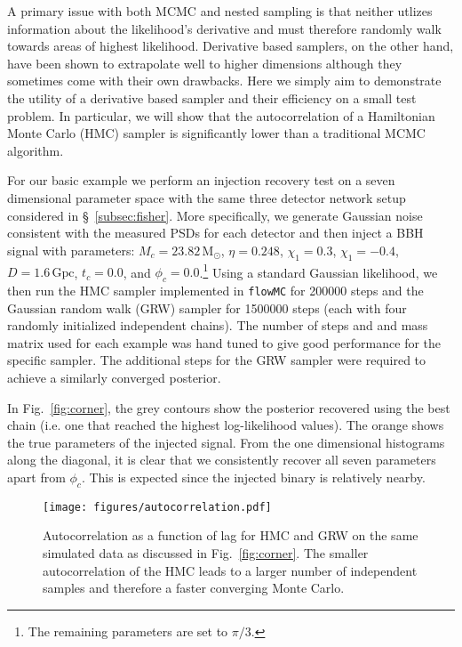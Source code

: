 \documentclass[twocolumn]{aastex631}
\newcommand{\flowMC}{\texttt{flowMC}\xspace}
\begin{document}
A primary issue with both MCMC and nested sampling is that neither utlizes information about the likelihood's derivative and must therefore randomly walk towards areas of highest likelihood.
Derivative based samplers, on the other hand, have been shown to extrapolate well to higher dimensions although they sometimes come with their own drawbacks.
Here we simply aim to demonstrate the utility of a derivative based sampler and their efficiency on a small test problem.
In particular, we will show that the autocorrelation of a Hamiltonian Monte Carlo (HMC) sampler is significantly lower than a traditional MCMC algorithm.

For our basic example we perform an injection recovery test on a seven dimensional parameter space with the same three detector network setup considered in \S~\ref{subsec:fisher}.
More specifically, we generate Gaussian noise consistent with the measured PSDs for each detector and then inject a BBH signal with parameters: $M_c = 23.82\,\mathrm{M_\odot}$,  $\eta = 0.248$, $\chi_1=0.3$, $\chi_1=-0.4$, $D = 1.6\,\mathrm{Gpc}$, $t_c = 0.0$, and $\phi_c = 0.0$.\footnote{
    The remaining parameters are set to $\pi/3$.
}
Using a standard Gaussian likelihood, we then run the HMC sampler implemented in \flowMC for 200000 steps and the Gaussian random walk (GRW) sampler for 1500000 steps (each with four randomly initialized independent chains). 
The number of steps and and mass matrix used for each example was hand tuned to give good performance for the specific sampler.
The additional steps for the GRW sampler were required to achieve a similarly converged posterior.

In Fig.~\ref{fig:corner}, the grey contours show the posterior recovered using the best chain (i.e. one that reached the highest log-likelihood values).
The orange shows the true parameters of the injected signal.
From the one dimensional histograms along the diagonal, it is clear that we consistently recover all seven parameters apart from $\phi_c$.
This is expected since the injected binary is relatively nearby.

\begin{figure}[t]
	\begin{centering}
		\texttt{[image: figures/autocorrelation.pdf]}
		\caption{
			Autocorrelation as a function of lag for HMC and GRW on the same simulated data as discussed in Fig.~\ref{fig:corner}.
            The smaller autocorrelation of the HMC leads to a larger number of independent samples and therefore a faster converging Monte Carlo.
		}
		\label{fig:autocorrelation}
	\end{centering}
\end{figure}
\end{document}
